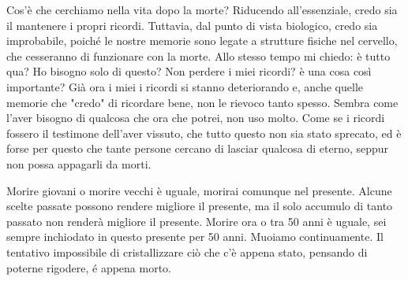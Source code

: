\documentclass[12pt]{book} %
\begin{document}
Cos'è che cerchiamo nella vita dopo la morte? Riducendo all'essenziale, credo sia il mantenere i propri ricordi. Tuttavia, dal punto di vista biologico, credo sia improbabile, poiché le nostre memorie sono legate a strutture fisiche nel cervello, che cesseranno di funzionare con la morte. Allo stesso tempo mi chiedo: è tutto qua? Ho bisogno solo di questo? Non perdere i miei ricordi? è una cosa così importante? Già ora i miei i ricordi si stanno deteriorando e, anche quelle memorie che "credo" di ricordare bene, non le rievoco tanto spesso. Sembra come l'aver bisogno di qualcosa che ora che potrei, non uso molto. Come se i ricordi fossero il testimone dell'aver vissuto, che tutto questo non sia stato sprecato, ed è forse per questo che tante persone cercano di lasciar qualcosa di eterno, seppur non possa appagarli da morti.

Morire giovani o morire vecchi è uguale, morirai comunque nel presente. Alcune scelte passate possono rendere migliore il presente, ma il solo accumulo di tanto passato non renderà migliore il presente.
Morire ora o tra 50 anni è uguale, sei sempre inchiodato in questo presente per 50 anni. Muoiamo continuamente. Il tentativo impossibile di cristallizzare ciò che c'è appena stato, pensando di poterne rigodere, é appena morto.
\end{document}
